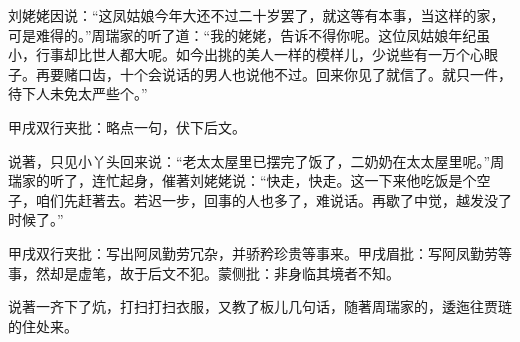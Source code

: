 \begin{parag}
    刘姥姥因说：“这凤姑娘今年大还不过二十岁罢了，就这等有本事，当这样的家，可是难得的。”周瑞家的听了道：“我的姥姥，告诉不得你呢。这位凤姑娘年纪虽小，行事却比世人都大呢。如今出挑的美人一样的模样儿，少说些有一万个心眼子。再要赌口齿，十个会说话的男人也说他不过。回来你见了就信了。就只一件，待下人未免太严些个。”\begin{note}甲戌双行夹批：略点一句，伏下后文。\end{note}说著，只见小丫头回来说：“老太太屋里已摆完了饭了，二奶奶在太太屋里呢。”周瑞家的听了，连忙起身，催著刘姥姥说：“快走，快走。这一下来他吃饭是个空子，咱们先赶著去。若迟一步，回事的人也多了，难说话。再歇了中觉，越发没了时候了。”\begin{note}甲戌双行夹批：写出阿凤勤劳冗杂，并骄矜珍贵等事来。甲戌眉批：写阿凤勤劳等事，然却是虚笔，故于后文不犯。蒙侧批：非身临其境者不知。\end{note}说著一齐下了炕，打扫打扫衣服，又教了板儿几句话，随著周瑞家的，逶迤往贾琏的住处来。
\end{parag}



